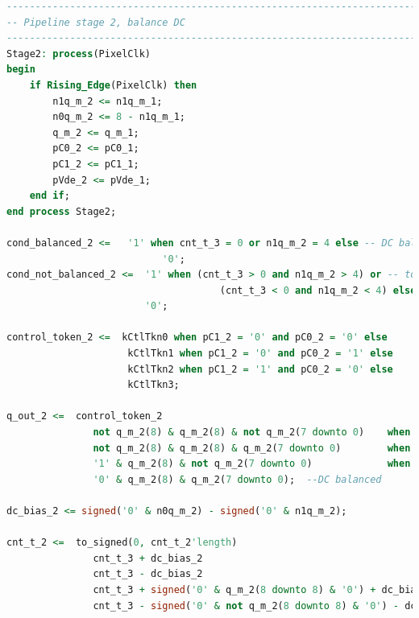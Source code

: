 \begin{lstlisting}[caption={TMDS encoder DC balancing stage.}, label={lst:encoder_stage_2}, language=VHDL]
----------------------------------------------------------------------------------
-- Pipeline stage 2, balance DC
----------------------------------------------------------------------------------
Stage2: process(PixelClk)
begin
    if Rising_Edge(PixelClk) then
        n1q_m_2 <= n1q_m_1;
        n0q_m_2 <= 8 - n1q_m_1;
        q_m_2 <= q_m_1;
        pC0_2 <= pC0_1;
        pC1_2 <= pC1_1;
        pVde_2 <= pVde_1;
    end if;
end process Stage2;

cond_balanced_2 <=   '1' when cnt_t_3 = 0 or n1q_m_2 = 4 else -- DC balanced output
                           '0';
cond_not_balanced_2 <=  '1' when (cnt_t_3 > 0 and n1q_m_2 > 4) or -- too many 1's
                                     (cnt_t_3 < 0 and n1q_m_2 < 4) else -- too many 0's
                        '0';

control_token_2 <=  kCtlTkn0 when pC1_2 = '0' and pC0_2 = '0' else
                     kCtlTkn1 when pC1_2 = '0' and pC0_2 = '1' else
                     kCtlTkn2 when pC1_2 = '1' and pC0_2 = '0' else
                     kCtlTkn3;
                            
q_out_2 <=  control_token_2                                             when pVde_2 = '0' else  --control period
               not q_m_2(8) & q_m_2(8) & not q_m_2(7 downto 0)    when cond_balanced_2 = '1' and q_m_2(8) = '0' else
               not q_m_2(8) & q_m_2(8) & q_m_2(7 downto 0)        when cond_balanced_2 = '1' and q_m_2(8) = '1' else
               '1' & q_m_2(8) & not q_m_2(7 downto 0)             when cond_not_balanced_2 = '1' else
               '0' & q_m_2(8) & q_m_2(7 downto 0);  --DC balanced

dc_bias_2 <= signed('0' & n0q_m_2) - signed('0' & n1q_m_2);

cnt_t_2 <=  to_signed(0, cnt_t_2'length)                                   when pVde_2 = '0' else   --control period
               cnt_t_3 + dc_bias_2                                            when cond_balanced_2 = '1' and q_m_2(8) = '0' else
               cnt_t_3 - dc_bias_2                                            when cond_balanced_2 = '1' and q_m_2(8) = '1' else
               cnt_t_3 + signed('0' & q_m_2(8 downto 8) & '0') + dc_bias_2     when cond_not_balanced_2 = '1' else
               cnt_t_3 - signed('0' & not q_m_2(8 downto 8) & '0') - dc_bias_2;
\end{lstlisting}

